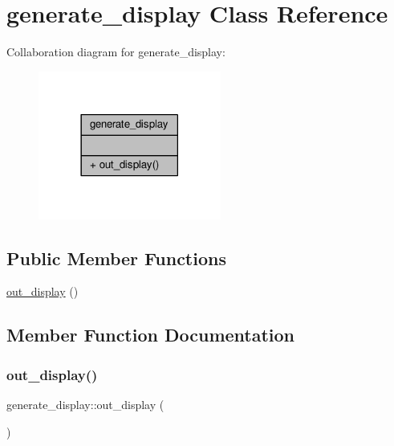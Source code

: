 \hypertarget{classgenerate__display}{}\section{generate\+\_\+display Class Reference}
\label{classgenerate__display}


Collaboration diagram for generate\+\_\+display\+:
\nopagebreak
\begin{figure}[H]
\begin{center}
\leavevmode
\includegraphics[width=170pt]{classgenerate__display__coll__graph}
\end{center}
\end{figure}
\subsection*{Public Member Functions}
\begin{DoxyCompactItemize}
\item 
\hyperlink{classgenerate__display_a15c857836239ee6642895f284ba44507}{out\+\_\+display} ()
\end{DoxyCompactItemize}


\subsection{Member Function Documentation}
\mbox{\label{classgenerate__display_a15c857836239ee6642895f284ba44507}} 
\subsubsection{\texorpdfstring{out\+\_\+display()}{out\_display()}}
{\footnotesize\ttfamily generate\+\_\+display\+::out\+\_\+display (\begin{DoxyParamCaption}{ }\end{DoxyParamCaption})\hspace{0.3cm}{\ttfamily [inline]}}

